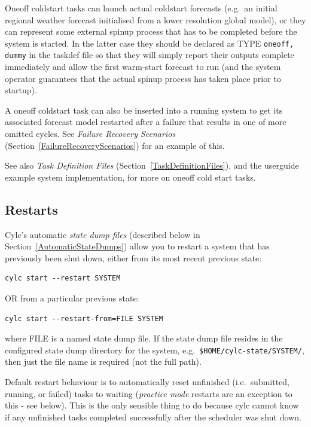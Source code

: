 \documentclass[11pt,a4paper]{article}
\begin{document}
Oneoff coldstart tasks can launch actual coldstart forecasts (e.g.\ an
initial regional weather forecast initialised from a lower resolution
global model), or they can represent some external spinup process that
has to be completed before the system is started. In the latter case
they should be declared as TYPE \lstinline=oneoff, dummy= in the taskdef
file so that they will simply report their outputs complete immediately
and allow the first warm-start forecast to run (and the system operator
guarantees that the actual spinup process has taken place prior to
startup).

A oneoff coldstart task can also be inserted into a running system to
get its associated forecast model restarted after a failure that results
in one of more omitted cycles. See {\em Failure Recovery Scenarios}
(Section~\ref{FailureRecoveryScenarios}) for an example of this. 

See also {\em Task Definition Files}
(Section~\ref{TaskDefinitionFiles}), and the userguide example system
implementation, for more on oneoff cold start tasks.

\subsection{Restarts}
\label{Restarts}

Cylc's automatic {\em state dump files} (described below in
Section~\ref{AutomaticStateDumps}) allow you to restart a system
that has previously been shut down, either from 
its most recent previous state:

\begin{lstlisting}
cylc start --restart SYSTEM
\end{lstlisting}

OR from a particular previous state:

\begin{lstlisting}
cylc start --restart-from=FILE SYSTEM
\end{lstlisting}

where FILE is a named state dump file. If the state dump file resides in
the configured state dump directory for the system, e.g.\  
\lstinline=$HOME/cylc-state/SYSTEM/=, then just the file name is required 
(not the full path).

Default restart behaviour is to automatically reset unfinished (i.e.\
submitted, running, or failed) tasks to waiting ({\em practice mode}
restarts are an exception to this - see below).  This is the only
sensible thing to do because cylc cannot know if any unfinished tasks
completed successfully after the scheduler was shut down.  
\end{document}
